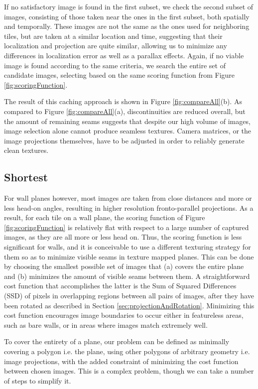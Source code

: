 \documentclass[]{spie}  %
\begin{document}
If no satisfactory image is found in the first subset, we check the
second subset of images, consisting of those taken near the ones in
the first subset, both spatially and temporally. These images are not
the same as the ones used for neighboring tiles, but are taken at a
similar location and time, suggesting that their localization and
projection are quite similar, allowing us to minimize any differences
in localization error as well as a parallax effects. Again, if no
viable image is found according to the same criteria, we search the
entire set of candidate images, selecting based on the same scoring
function from Figure \ref{fig:scoringFunction}.

The result of this caching approach is shown in Figure
\ref{fig:compareAll}(b). As compared to Figure
\ref{fig:compareAll}(a), discontinuities are reduced overall, but the
amount of remaining seams suggests that despite our high volume of
images, image selection alone cannot produce seamless textures. Camera
matrices, or the image projections themselves, have to be adjusted in
order to reliably generate clean textures.

\subsection{Shortest}
For wall planes however, most images are taken from close distances
and more or less head-on angles, resulting in higher resolution
fronto-parallel projections. As a result, for each tile on a wall
plane, the scoring function of Figure \ref{fig:scoringFunction} is
relatively flat with respect to a large number of captured images, as
they are all more or less head on. Thus, the scoring function is less
significant for walls, and it is conceivable to use a different
texturing strategy for them so as to minimize visible seams in texture
mapped planes. This can be done by choosing the smallest possible set
of images that (a) covers the entire plane and (b) minimizes the
amount of visible seams between them. A straightforward cost function
that accomplishes the latter is the Sum of Squared Differences (SSD)
of pixels in overlapping regions between all pairs of images, after
they have been rotated as described in Section
\ref{sec:projectionAndRotation}. Minimizing this cost function
encourages image boundaries to occur either in featureless areas, such
as bare walls, or in areas where images match extremely well.

To cover the entirety of a plane, our problem can be defined as
minimally covering a polygon i.e. the plane, using other polygons of
arbitrary geometry i.e. image projections, with the added constraint
of minimizing the cost function between chosen images.  This is a
complex problem, though we can take a number of steps to simplify it.
\end{document}
